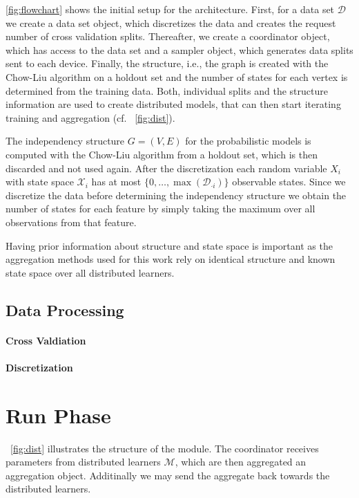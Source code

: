 \fig \ref{fig:flowchart} shows the initial setup for the architecture. 
First, for a data set $\mathcal{D}$ we create a data set object, which discretizes the data and creates the request number of cross validation splits. 
Thereafter, we create a coordinator object, which has access to the data set and a sampler object, which generates data splits sent to each device.
Finally, the structure, i.e., the graph is created with the Chow-Liu algorithm on a holdout set and the number of states for each vertex is determined from the training data.
Both, individual splits and the structure information are used to create distributed models, that can then start iterating training and aggregation (cf. \fig~\ref{fig:dist}).

The independency structure $G=(V,E)$ for the probabilistic models is computed with the Chow-Liu algorithm from a holdout set, which is then discarded and not used again.
After the discretization each random variable $X_i$ with state space $\mathcal{X}_i$ has at most $\{0, \ldots, \max(\mathcal{D}_{\cdot i})\}$ observable states.
Since we discretize the data before determining the independency structure we obtain the number of states for each feature by simply taking the maximum over all observations from that feature. 

Having prior information about structure and state space is important as the aggregation methods used for this work rely on identical structure and known state space over all distributed learners.

\subsection{Data Processing}


\paragraph*{Cross Valdiation}

\paragraph*{Discretization}
\section{Run Phase}

\fig~\ref{fig:dist} illustrates the structure of the module. 
The coordinator receives parameters from distributed learners $\mathcal{M}$, which are then aggregated an aggregation object. 
Additinally we may send the aggregate back towards the distributed learners.

